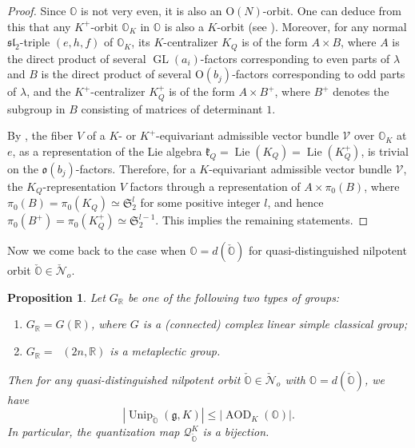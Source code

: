 \documentclass[11pt, a4paper]{amsart}
\newcommand{\g}{\mathfrak{g}}
\newcommand{\orb}{\mathbb{O}}
\newcommand{\orbk}{\orb_{K}}
\newcommand{\fk}{\mathfrak{k}}
\newcommand{\fo}{\mathfrak{o}}
\newcommand{\fS}{\mathfrak{S}}
\newcommand{\ckorb}{\check{\orb}}
\newcommand{\cN}{\mathcal{N}}
\newcommand{\cV}{\mathcal{V}}
\DeclareMathOperator{\Lie}{Lie}
\DeclareMathOperator{\AOD}{AOD}
\DeclareMathOperator{\Unip}{Unip}
\DeclareMathOperator{\Mp}{\widetilde{Sp}}
\newcommand{\AODK}{\AOD_K}
\newcommand{\UnipOv}{\Unip_{\ckorb}}
\newcommand{\R}{\mathbb{R}}
\newcommand{\quan}{\mathcal{Q}}
\newcommand{\GR}{G_\R}
\newcommand{\slf}{\mathfrak{sl}}
\newcommand{\GL}{\operatorname{GL}}
\newtheorem{Prop}[Thm]{Proposition}
\theoremstyle{definition}
\numberwithin{equation}{section}
\begin{document}
\begin{proof}
	Since $\orb$ is not very even, it is also an $\mathrm{O}(N)$-orbit. 
	One can deduce from this that any $K^+$-orbit $\orbk$ in $\orb$ is also a $K$-orbit (see \cite[Theorem 9.3.4]{CM}). 
	Moreover, for any normal $\slf_2$-triple $(e, h, f)$ of $\orbk$, its $K$-centralizer $K_Q$ is of the form $A \times B$, where $A$ is the direct product of several $\GL(a_i)$-factors corresponding to even parts of $\lambda$ and $B$ is the direct product of several $\mathrm{O}(b_j)$-factors corresponding to odd parts of $\lambda$, and the $K^+$-centralizer $K_Q^+$ is of the form $A \times B^+$, where $B^+$ denotes the subgroup in $B$ consisting of matrices of determinant $1$. 

	By \cite[Lemma 7]{Ohta:Adm}, the fiber $V$ of a $K$- or $K^+$-equivariant admissible vector bundle $\cV$ over $\orbk$ at $e$, as a representation of the Lie algebra $\fk_Q = \Lie(K_Q) = \Lie(K_Q^+)$, is trivial on the $\fo(b_j)$-factors. Therefore, for a $K$-equivariant admissible vector bundle $\cV$, the $K_Q$-representation $V$ factors through a representation of $A \times \pi_0(B)$, where $\pi_0(B) = \pi_0(K_Q) \simeq \fS_2^l$ for some positive integer $l$, and hence $\pi_0(B^+) = \pi_0(K_Q^+) \simeq \fS_2^{l-1}$.
	This implies the remaining statements.
\end{proof}

Now we come back to the case when $\orb=d(\ckorb)$ for quasi-distinguished nilpotent orbit $\ckorb \in \check{\cN}_o$.

\begin{Prop} \label{prop:counting_classical}
	Let $\GR$ be one of the following two types of groups:
	\begin{enumerate}
		\item $\GR = G(\R)$, where $G$ is a (connected) complex linear simple classical group;
		\item $\GR = \Mp(2n,\R)$ is a metaplectic group.
	\end{enumerate}	
	Then for any quasi-distinguished nilpotent orbit $\ckorb \in \check{\cN}_o$ with $\orb=d(\ckorb)$, we have
	\[ |\UnipOv(\g, K)| \leqslant |\AODK(\orb)|.\]
	In particular, the quantization map $\quan_{\ckorb}^K$ is a bijection.
\end{Prop}
	
\end{document}
